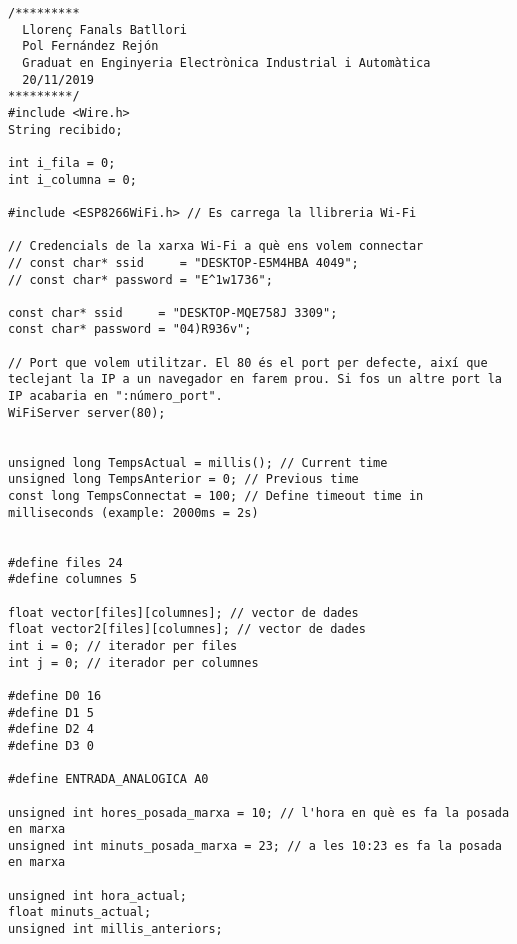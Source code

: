 \begin{lstlisting}[style=myArduino]
/*********
  Llorenç Fanals Batllori
  Pol Fernández Rejón
  Graduat en Enginyeria Electrònica Industrial i Automàtica
  20/11/2019
*********/
#include <Wire.h>
String recibido;

int i_fila = 0;
int i_columna = 0;

#include <ESP8266WiFi.h> // Es carrega la llibreria Wi-Fi

// Credencials de la xarxa Wi-Fi a què ens volem connectar
// const char* ssid     = "DESKTOP-E5M4HBA 4049";
// const char* password = "E^1w1736";

const char* ssid     = "DESKTOP-MQE758J 3309";
const char* password = "04)R936v";

// Port que volem utilitzar. El 80 és el port per defecte, així que teclejant la IP a un navegador en farem prou. Si fos un altre port la IP acabaria en ":número_port".
WiFiServer server(80);


unsigned long TempsActual = millis(); // Current time
unsigned long TempsAnterior = 0; // Previous time
const long TempsConnectat = 100; // Define timeout time in milliseconds (example: 2000ms = 2s)


#define files 24
#define columnes 5

float vector[files][columnes]; // vector de dades
float vector2[files][columnes]; // vector de dades
int i = 0; // iterador per files
int j = 0; // iterador per columnes

#define D0 16
#define D1 5
#define D2 4
#define D3 0

#define ENTRADA_ANALOGICA A0

unsigned int hores_posada_marxa = 10; // l'hora en què es fa la posada en marxa
unsigned int minuts_posada_marxa = 23; // a les 10:23 es fa la posada en marxa

unsigned int hora_actual;
float minuts_actual;
unsigned int millis_anteriors;


\end{lstlisting}
